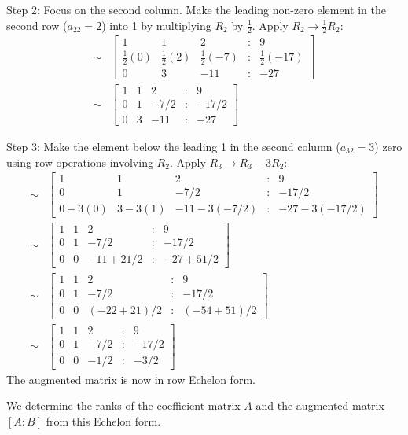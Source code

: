 \documentclass{article}
\begin{document}
Step 2: Focus on the second column. Make the leading non-zero element in the second row ($a_{22}=2$) into 1 by multiplying $R_2$ by $\frac{1}{2}$.
Apply $R_2 \to \frac{1}{2}R_2$:
\begin{align*} \sim &\begin{bmatrix} 1 & 1 & 2 & : & 9 \\ \frac{1}{2}(0) & \frac{1}{2}(2) & \frac{1}{2}(-7) & : & \frac{1}{2}(-17) \\ 0 & 3 & -11 & : & -27 \end{bmatrix} \\ \sim &\begin{bmatrix} 1 & 1 & 2 & : & 9 \\ 0 & 1 & -7/2 & : & -17/2 \\ 0 & 3 & -11 & : & -27 \end{bmatrix}\end{align*}

Step 3: Make the element below the leading 1 in the second column ($a_{32}=3$) zero using row operations involving $R_2$.
Apply $R_3 \to R_3 - 3R_2$:
\begin{align*} \sim &\begin{bmatrix} 1 & 1 & 2 & : & 9 \\ 0 & 1 & -7/2 & : & -17/2 \\ 0 - 3(0) & 3 - 3(1) & -11 - 3(-7/2) & : & -27 - 3(-17/2) \end{bmatrix} \\ \sim &\begin{bmatrix} 1 & 1 & 2 & : & 9 \\ 0 & 1 & -7/2 & : & -17/2 \\ 0 & 0 & -11 + 21/2 & : & -27 + 51/2 \end{bmatrix} \\ \sim &\begin{bmatrix} 1 & 1 & 2 & : & 9 \\ 0 & 1 & -7/2 & : & -17/2 \\ 0 & 0 & (-22 + 21)/2 & : & (-54 + 51)/2 \end{bmatrix} \\ \sim &\begin{bmatrix} 1 & 1 & 2 & : & 9 \\ 0 & 1 & -7/2 & : & -17/2 \\ 0 & 0 & -1/2 & : & -3/2 \end{bmatrix}\end{align*}
The augmented matrix is now in row Echelon form.

We determine the ranks of the coefficient matrix $A$ and the augmented matrix $[A:B]$ from this Echelon form.
\end{document}
